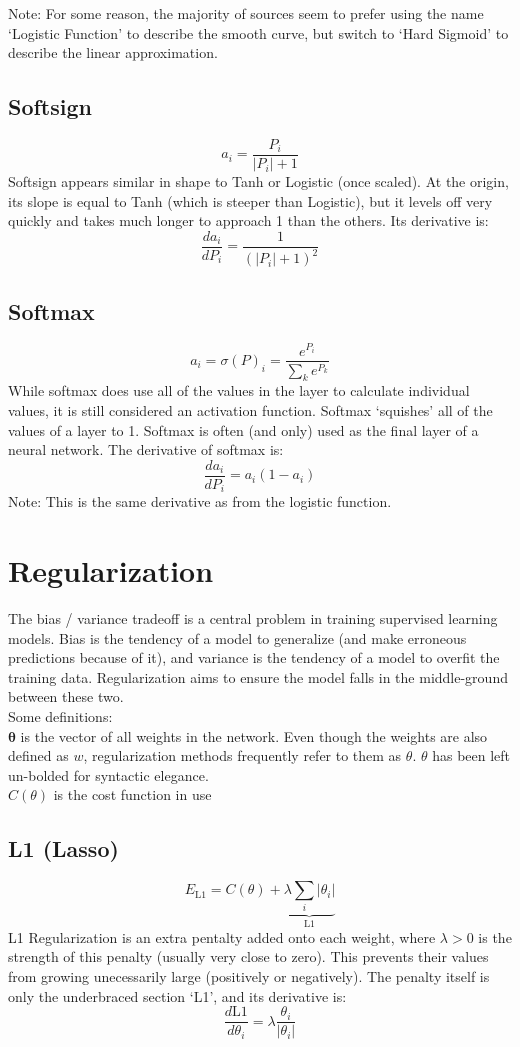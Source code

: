 \documentclass[fleqn]{article}
\begin{document}
Note: For some reason, the majority of sources seem to prefer using
the name `Logistic Function' to describe the smooth curve, but switch to
`Hard Sigmoid' to describe the linear approximation.

\subsection{Softsign}
\[ a_i = \frac{P_i}{|P_i| + 1} \]
%
Softsign appears similar in shape to Tanh or Logistic (once scaled). At
the origin, its slope is equal to Tanh (which is steeper than Logistic),
but it levels off very quickly and takes much longer to approach 1 than
the others.
Its derivative is:
\[ \frac{d a_i}{d P_i} = \frac{1}{(|P_i|+1)^2} \]

\subsection{Softmax}
\[ a_i = \sigma(P)_i = \frac{e^{P_i}}{{\sum}_k e^{P_k}} \]
%
While softmax does use all of the values in the layer to calculate
individual values, it is still considered an activation function. Softmax
`squishes' all of the values of a layer to 1. Softmax is often (and only)
used as the final layer of a neural network. The derivative of softmax is:
\[ \frac{d a_i}{d P_i} = a_i(1 - a_i) \]
Note: This is the same derivative as from the logistic function.

\section{Regularization}

The bias / variance tradeoff is a central problem in training supervised
learning models. Bias is the tendency of a model to generalize (and
make erroneous predictions because of it), and variance is the tendency
of a model to overfit the training data. Regularization aims to ensure the
model falls in the middle-ground between these two.\\
Some definitions:\\
\hspace*{6mm} $\bm{\theta}$ is the vector of all weights in the network.
	Even though the weights are also defined as $w$, regularization
	methods frequently refer to them as $\theta$. $\theta$ has been left
	un-bolded for syntactic elegance.\\
\hspace*{6mm} $C(\theta)$ is the cost function in use

\subsection{L1 (Lasso)}
\[ E_\text{L1} = C(\theta) +
\underbrace{\lambda{\sum}_i |\theta_i|}_\text{L1} \]
%
L1 Regularization is an extra pentalty added onto each weight, where
$\lambda > 0$ is the strength of this penalty (usually very close to
zero). This prevents their values from growing unecessarily large
(positively or negatively). The penalty itself is only the underbraced
section `L1', and its derivative is:
\[ \frac{d \text{L1}}{d \theta_i} = \lambda \frac{\theta_i}{|\theta_i|} \]
\end{document}
